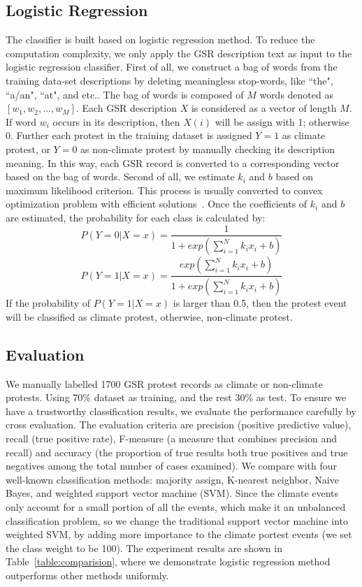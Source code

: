\subsection{Logistic Regression}
The classifier is built based on logistic regression method.
To reduce the computation complexity, we only apply the GSR description text as input to the logistic regression classifier. First of all, we construct a bag of words from the training data-set descriptions by deleting meaningless stop-words, like ``the", ``a/an", ``at", and etc.. The bag of words is composed of $M$ words denoted as $[w_1, w_2, ..., w_M]$.
Each GSR description $X$ is considered as a vector of length $M$. If word $w_i$ occurs in its description, then $X(i)$ will be assign with 1; otherwise 0. Further each protest in the training dataset is assigned $Y=1$ as climate protest, or $Y=0$ as non-climate protest by manually checking its description meaning. In this way, each GSR record is converted to a corresponding vector based on the bag of words. Second of all, we estimate $k_i$ and $b$ based on maximum likelihood criterion. This process is usually converted to convex optimization problem with efficient solutions~\cite{james2013introduction}. Once the coefficients of $k_i$ and $b$ are estimated, the probability for each class is calculated by:
$$P(Y = 0| X=x)= \frac{1}{1+exp( {\sum_{i=1}^{N} k_ix_i}+b)}$$
$$P(Y = 1| X=x)= \frac{exp( {\sum_{i=1}^{N} k_ix_i}+b)}{1+exp( {\sum_{i=1}^{N} k_ix_i}+b)}$$
If the probability of $P(Y = 1| X=x)$ is larger than 0.5, then the protest event will be classified as climate protest, otherwise, non-climate protest.


\subsection{Evaluation}
We manually labelled 1700 GSR protest records as climate or non-climate protests. Using 70\% dataset as training, and the rest 30\% as test. To ensure we have a trustworthy classification results, we evaluate the performance carefully by cross evaluation. The evaluation criteria are precision (positive predictive value), recall (true positive rate), F-measure (a measure that combines precision and recall) and accuracy (the proportion of true results both true positives and true negatives among the total number of cases examined). We compare with four well-known classification methods: majority assign, K-nearest neighbor, Naive Bayes, and weighted support vector machine (SVM). Since the climate events only account for a small portion of all the events, which make it an unbalanced classification problem, so we change the traditional support vector machine into weighted SVM, by adding more importance to the climate portest events (we set the class weight to be 100). The experiment results are shown in Table~\ref{table:comparision}, where we demonstrate logistic regression method outperforms other methods uniformly.

